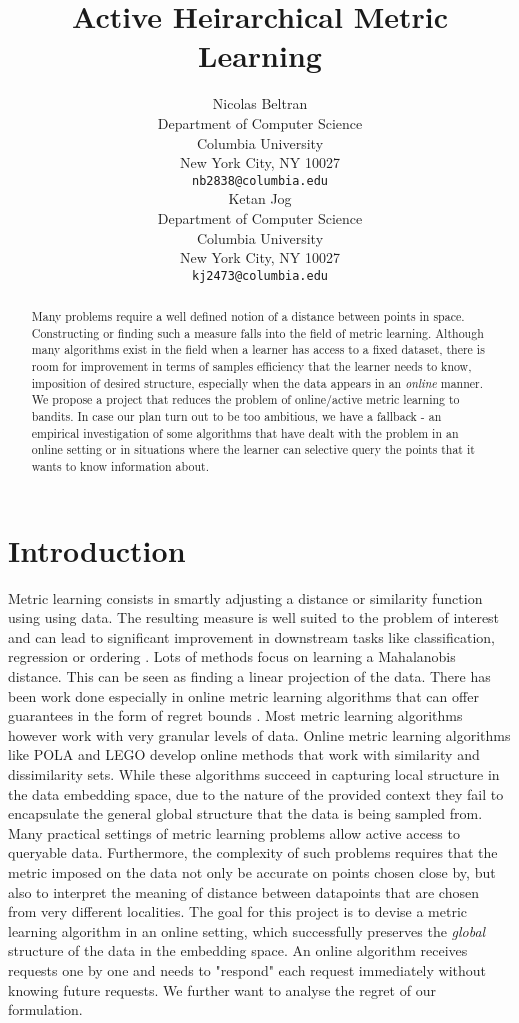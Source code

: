\documentclass{article}
\title{Active Heirarchical Metric Learning}
\author{
  Nicolas Beltran\\
  Department of Computer Science\\
  Columbia University\\
  New York City, NY 10027 \\
  \texttt{nb2838@columbia.edu}\\
  \And
  Ketan Jog\\
  Department of Computer Science\\
  Columbia University\\
  New York City, NY 10027 \\
  \texttt{kj2473@columbia.edu}\\
}
\begin{document}
\maketitle

\begin{abstract}
    Many problems require a well defined notion of a distance between points in space.
Constructing or finding such a measure falls into the field of metric learning.
Although many algorithms exist in the field when a learner has access to a fixed dataset,  there is room for improvement in terms of samples efficiency that the learner needs to know, imposition of desired structure, especially when the data appears in an \textit{online} manner. 
We propose a project that reduces the problem of online/active metric learning to bandits. In case our plan turn out to be too ambitious, we have a fallback - an empirical investigation of some algorithms that have dealt with the problem in an online setting or in situations where the learner can selective query the points that it wants to know information about.

\end{abstract}

\section{Introduction}
Metric learning consists in smartly adjusting a distance or similarity function using using data. The resulting measure is well suited to the problem of interest and can lead to significant improvement in downstream tasks like classification, regression or ordering \cite{DBLP:journals/corr/abs-1209-1086}. Lots of methods focus on learning a Mahalanobis distance. This can be seen as finding a linear projection of the data. There has been work done especially in online metric learning algorithms that can offer guarantees in the form of regret bounds \cite{onlinemetric}. Most metric learning algorithms however work with very granular levels of data. Online metric learning algorithms like POLA and LEGO develop online methods that work with similarity and dissimilarity sets. While these algorithms succeed in capturing local structure in the data embedding space, due to the nature of the provided context they fail to encapsulate the general global structure that the data is being sampled from. Many practical settings of metric learning problems allow active access to queryable data. Furthermore, the complexity of such problems requires that the metric imposed on the data not only be accurate on points chosen close by, but also to interpret the meaning of distance between datapoints that are chosen from very different localities. The goal for this project is to devise a metric learning algorithm in an online setting, which successfully preserves the \textit{global} structure of the data in the embedding space. An online algorithm receives requests one by one and needs to "respond" each request immediately without knowing future requests. We further want to analyse the regret of our formulation. 
\end{document}
